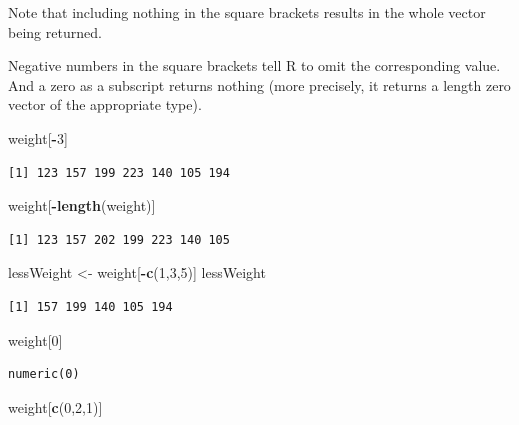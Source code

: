 \documentclass[
]{krantz}
\makeatletter
\newenvironment{Shaded}{\begin{snugshade}}{\end{snugshade}}
\newcommand{\DecValTok}[1]{\textcolor[rgb]{0.06,0.06,0.06}{#1}}
\newcommand{\KeywordTok}[1]{\textcolor[rgb]{0.27,0.27,0.27}{\textbf{#1}}}
\newcommand{\NormalTok}[1]{#1}
\newcommand{\OperatorTok}[1]{\textcolor[rgb]{0.43,0.43,0.43}{\textbf{#1}}}
\newcommand{\StringTok}[1]{\textcolor[rgb]{0.5,0.5,0.5}{#1}}
\newenvironment{kframe}{%
\medskip{}
\setlength{\fboxsep}{.8em}
 \def\at@end@of@kframe{}%
 \ifinner\ifhmode%
  \def\at@end@of@kframe{\end{minipage}}%
  \begin{minipage}{\columnwidth}%
 \fi\fi%
 \def\FrameCommand##1{\hskip\@totalleftmargin \hskip-\fboxsep
 \colorbox{shadecolor}{##1}\hskip-\fboxsep
     \hskip-\linewidth \hskip-\@totalleftmargin \hskip\columnwidth}%
 \MakeFramed {\advance\hsize-\width
   \@totalleftmargin\z@ \linewidth\hsize
   \@setminipage}}%
 {\par\unskip\endMakeFramed%
 \at@end@of@kframe}
\renewenvironment{Shaded}{\begin{kframe}}{\end{kframe}}
\makeatother
\begin{document}
Note that including nothing in the square brackets results in the whole vector being returned.

Negative numbers in the square brackets tell R to omit the corresponding value. And a zero as a subscript returns nothing (more precisely, it returns a length zero vector of the appropriate type).

\begin{Shaded}
\begin{Highlighting}[]
\NormalTok{weight[}\OperatorTok{{-}}\DecValTok{3}\NormalTok{]}
\end{Highlighting}
\end{Shaded}

\begin{verbatim}
[1] 123 157 199 223 140 105 194
\end{verbatim}

\begin{Shaded}
\begin{Highlighting}[]
\NormalTok{weight[}\OperatorTok{{-}}\KeywordTok{length}\NormalTok{(weight)]}
\end{Highlighting}
\end{Shaded}

\begin{verbatim}
[1] 123 157 202 199 223 140 105
\end{verbatim}

\begin{Shaded}
\begin{Highlighting}[]
\NormalTok{lessWeight \textless{}{-}}\StringTok{ }\NormalTok{weight[}\OperatorTok{{-}}\KeywordTok{c}\NormalTok{(}\DecValTok{1}\NormalTok{,}\DecValTok{3}\NormalTok{,}\DecValTok{5}\NormalTok{)]}
\NormalTok{lessWeight}
\end{Highlighting}
\end{Shaded}

\begin{verbatim}
[1] 157 199 140 105 194
\end{verbatim}

\begin{Shaded}
\begin{Highlighting}[]
\NormalTok{weight[}\DecValTok{0}\NormalTok{]}
\end{Highlighting}
\end{Shaded}

\begin{verbatim}
numeric(0)
\end{verbatim}

\begin{Shaded}
\begin{Highlighting}[]
\NormalTok{weight[}\KeywordTok{c}\NormalTok{(}\DecValTok{0}\NormalTok{,}\DecValTok{2}\NormalTok{,}\DecValTok{1}\NormalTok{)]}
\end{Highlighting}
\end{Shaded}
\end{document}
